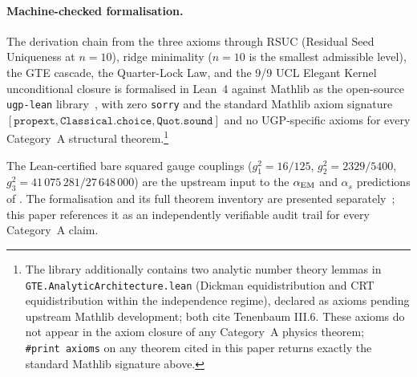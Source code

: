 \documentclass[11pt]{article}
\theoremstyle{remark}
\begin{document}
\paragraph{Machine-checked formalisation.}
\begin{sloppypar}
The derivation chain from the three axioms through RSUC (Residual Seed Uniqueness at $n=10$), ridge minimality ($n=10$ is the smallest admissible level), the GTE cascade, the Quarter-Lock Law, and the 9/9 UCL Elegant Kernel unconditional closure is formalised in Lean~4 against Mathlib as the open-source \texttt{ugp-lean} library~\cite{ugp-lean}, with zero \texttt{sorry} and the standard Mathlib axiom signature $[\texttt{propext}, \texttt{Classical.choice}, \texttt{Quot.sound}]$ and no UGP-specific axioms for every Category~A structural theorem.\footnote{The library additionally contains two analytic number theory lemmas in \texttt{GTE\allowbreak.\allowbreak Analytic\allowbreak Architecture\allowbreak.lean} (Dickman equidistribution and CRT equidistribution within the independence regime), declared as axioms pending upstream Mathlib development; both cite Tenenbaum III.6. These axioms do not appear in the axiom closure of any Category~A physics theorem; \texttt{\#print~axioms} on any theorem cited in this paper returns exactly the standard Mathlib signature above.}

The Lean-certified bare squared gauge couplings ($g_1^2 = 16/125$, $g_2^2 = 2329/5400$, $g_3^2 = 41\,075\,281/27\,648\,000$) are the upstream input to the $\alpha_{\rm EM}$ and $\alpha_s$ predictions of .  The formalisation and its full theorem inventory are presented separately~\cite{SpivackUGPFormalization}; this paper references it as an independently verifiable audit trail for every Category~A claim.
\end{sloppypar}
\renewcommand{\arraystretch}{1.35}
\end{document}

